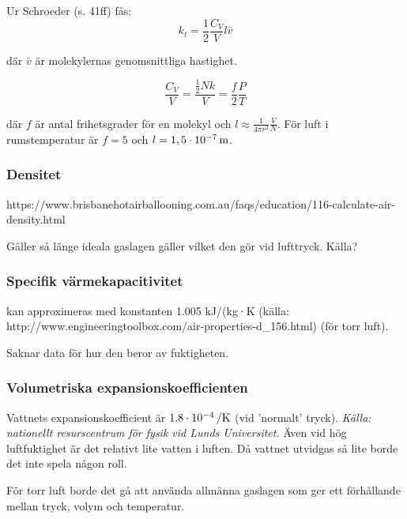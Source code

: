 Ur Schroeder (s. 41ff) fås:
\begin{equation}
k_t=\frac{1}{2}\frac{C_V}{V} l \bar{v}
\end{equation}

där $\bar{v}$ är molekylernas genomsnittliga hastighet.

\begin{equation}
\frac{C_V}{V}=\frac{\tfrac{1}{2}Nk}{V}=\frac{f}{2}\frac{P}{T}
\end{equation}

där $f$ är antal frihetsgrader för en molekyl och $l\approx\frac{1}{4\pi r^2}\frac{V}{N}$. För luft i rumstemperatur är $f=5$ och $l=\unit[1,5\cdot 10^{-7}]{m}$.



\subsubsection{Densitet} %
\label{sec:densitet}

https://www.brisbanehotairballooning.com.au/faqs/education/116-calculate-air-density.html

Gäller så länge ideala gaslagen gäller vilket den gör vid lufttryck. Källa?


\subsubsection{Specifik värmekapacitivitet}
kan approximeras med konstanten 1.005 kJ/(kg·K (källa: http://www.engineeringtoolbox.com/air-properties-d\_156.html) (för torr luft).

Saknar data för hur den beror av fuktigheten.


\subsubsection{Volumetriska expansionskoefficienten} %
Vattnets expansionskoefficient är $\unit[1.8\cdot 10^{-4}]{/K}$ (vid 'normalt' tryck). \emph{Källa: nationellt resurscentrum för fysik vid Lunds Universitet.} Även vid hög luftfuktighet är det relativt lite vatten i luften. Då vattnet utvidgas så lite borde det inte spela någon roll.

För torr luft borde det gå att använda allmänna gaslagen som ger ett förhållande mellan tryck, volym och temperatur.


